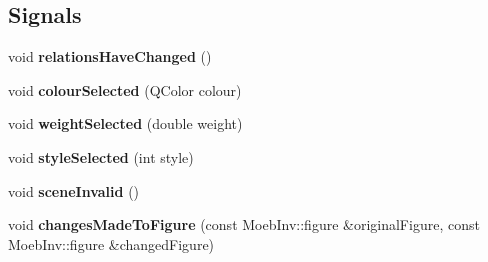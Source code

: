 \subsection*{Signals}
\begin{DoxyCompactItemize}
\item 
\mbox{\label{classcycle_context_menu_a42d360ffa2a047c3f43ded9fcec5982b}} 
void {\bfseries relations\+Have\+Changed} ()
\item 
\mbox{\label{classcycle_context_menu_acd8ba953b7b1edfac94b5ba4158217af}} 
void {\bfseries colour\+Selected} (Q\+Color colour)
\item 
\mbox{\label{classcycle_context_menu_ac91d09b750dfeace9334b67649fbbda0}} 
void {\bfseries weight\+Selected} (double weight)
\item 
\mbox{\label{classcycle_context_menu_a31b1b2e1f6596697cdac2cf0cb66359e}} 
void {\bfseries style\+Selected} (int style)
\item 
\mbox{\label{classcycle_context_menu_a0e28f14e9918aef074523854b5364c3e}} 
void {\bfseries scene\+Invalid} ()
\item 
\mbox{\label{classcycle_context_menu_a6b92c1d84f101c8386d1152b680247ff}} 
void {\bfseries changes\+Made\+To\+Figure} (const Moeb\+Inv\+::figure \&original\+Figure, const Moeb\+Inv\+::figure \&changed\+Figure)
\end{DoxyCompactItemize}
